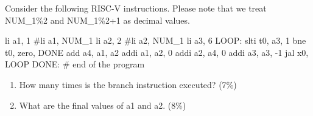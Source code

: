 \documentclass[12pt, a4paper]{article}
\begin{document}
\begin{q}{15}
Consider the following RISC-V instructions. Please note that we treat 
NUM\_1\%2 and NUM\_1\%2+1 as decimal values.
\begin{code}
    li a1, 1    #li a1, NUM_1%
    li a2, 2    #li a2, NUM_1%
    li a3, 6
    LOOP:
    slti t0, a3, 1
    bne t0, zero, DONE
    add a4, a1, a2
    addi a1, a2, 0
    addi a2, a4, 0
    addi a3, a3, -1
    jal x0, LOOP
    DONE:
    # end of the program
\end{code}
\begin{enumerate}
    \item How many times is the branch instruction executed? (7\%)
    \item What are the final values of a1 and a2. (8\%)
\end{enumerate}
\end{q}
\end{document}
